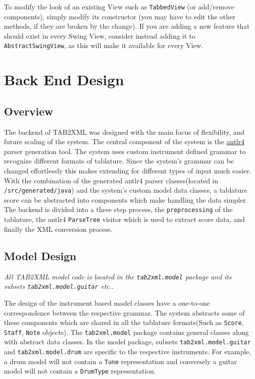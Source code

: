 \documentclass[11pt]{article}
\begin{document}
To modify the look of an existing View such as \texttt{TabbedView} (or add/remove components), simply modify its constructor (you may have to edit the other methods, if they are broken by the change).  If you are adding a new feature that should exist in every Swing View, consider instead adding it to \texttt{AbstractSwingView}, as this will make it available for every View.

\newpage

\section{Back End Design}
\label{sec:org9343de7}
\subsection{Overview}
\label{sec:orgd03264b}
The backend of TAB2XML was designed with the main focus of flexibility, and future scaling of the system. The central component of the system is the \href{https://www.antlr.org/}{antlr4} parser generation tool. The system uses custom instrument defined grammar to recognize different formats of tablature. Since the system's grammar can be changed effortlessly this makes extending for different types of input much easier. With the combination of the generated antlr4 parser classes(located in \texttt{/src/generated/java}) and the system's custom model data classes, a tablature score can be abstracted into components which make handling the data simpler. The backend is divided into a three step process, the \texttt{preprocessing} of the tablature, the antlr4 \texttt{ParseTree} visitor which is used to extract score data, and finally the XML conversion process.


\subsection{Model Design}
\label{sec:orgfc62407}
\emph{All TAB2XML model code is located in the \texttt{tab2xml.model} package and its subsets \texttt{tab2xml.model.guitar} etc..}

The design of the instrument based model classes have a one-to-one correspondence between the respective grammar. The system abstracts some of these components which are shared in all the tablature formats(Such as \texttt{Score}, \texttt{Staff}, \texttt{Note} objects). The \texttt{tab2xml.model} package contains general classes along with abstract data classes. In the model package, subsets \texttt{tab2xml.model.guitar} and \texttt{tab2xml.model.drum} are specific to the respective instruments. For example, a drum model will not contain a \texttt{Tune} representation and conversely a guitar model will not contain a \texttt{DrumType} representation.
\end{document}
